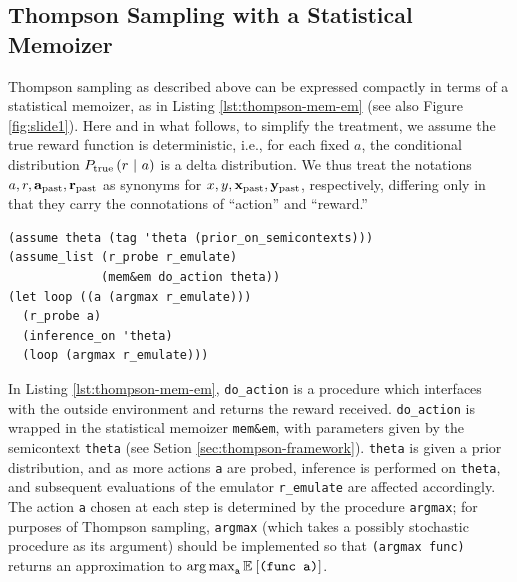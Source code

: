 \subsection{Thompson Sampling with a Statistical Memoizer}
\label{sec:thompson-mem-em}
Thompson sampling as described above can be expressed compactly in terms of a
statistical memoizer, as in Listing \ref{lst:thompson-mem-em} (see also Figure
\ref{fig:slide1}).  Here and in what follows, to simplify the treatment, we
assume the true reward function is deterministic, i.e., for each fixed $a$, the
conditional distribution $P_{\textrm{true}}\left( r \ \middle\vert\  a \right)$ is a delta distribution.  We
thus treat the notations $a,r,\mathbf{a}_{\textrm{past}},\mathbf{r}_{\textrm{past}}$ as synonyms for
$x,y,\mathbf{x}_{\textrm{past}},\mathbf{y}_{\textrm{past}}$, respectively, differing only in that they carry the
connotations of ``action'' and ``reward.''

\FloatBarrier
\begin{lstlisting}[frame=single,language=Venture,label=lst:thompson-mem-em,caption={
  Code template for Thompson sampling in pseudo-Venture using a statistical
  memoizer.  The choice of statistical memoizer (\texttt{mem\&em}), prior on
  semicontexts (\texttt{prior\_on\_semicontexts}), and approximation strategy
  for maximizing the emulator (\texttt{argmax}) are not included.
}]
(assume theta (tag 'theta (prior_on_semicontexts)))
(assume_list (r_probe r_emulate)
             (mem&em do_action theta))
(let loop ((a (argmax r_emulate)))
  (r_probe a)
  (inference_on 'theta)
  (loop (argmax r_emulate)))
\end{lstlisting}

\FloatBarrier

In Listing \ref{lst:thompson-mem-em}, \texttt{do\_action} is a procedure which
interfaces with the outside environment and returns the reward received.
\texttt{do\_action} is wrapped in the statistical memoizer \texttt{mem\&em},
with parameters given by the semicontext \texttt{theta} (see Setion
\ref{sec:thompson-framework}).  \texttt{theta} is given a prior distribution,
and as more actions \texttt{a} are probed, inference is performed on
\texttt{theta}, and subsequent evaluations of the emulator \texttt{r\_emulate}
are affected accordingly.  The action \texttt{a} chosen at each step is
determined by the procedure \texttt{argmax}; for purposes of Thompson sampling,
\texttt{argmax} (which takes a possibly stochastic procedure as its argument)
should be implemented so that \texttt{(argmax func)} returns an approximation to
$\operatorname*{arg\,max}_{\texttt{a}} \mathbb{E}_{}\left[ \texttt{(func a)} \right]$.

